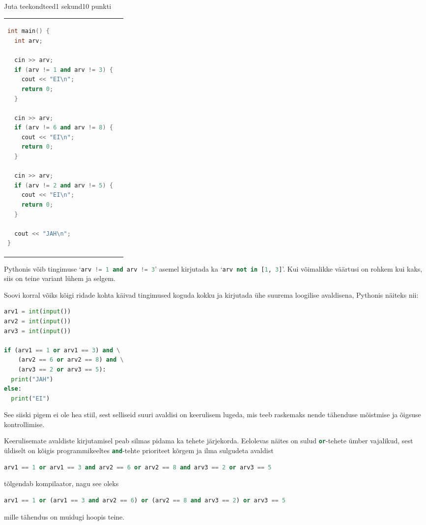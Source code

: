 \begin{yl}{1}{Juta teekond}{teed}{1 sekund}{10 punkti}
\begin{tabular}{p{\colwidth} p{\colwidth}}
\begin{lstlisting}[language=C++]
int main() {
  int arv;

  cin >> arv;
  if (arv != 1 and arv != 3) {
    cout << "EI\n";
    return 0;
  }

  cin >> arv;
  if (arv != 6 and arv != 8) {
    cout << "EI\n";
    return 0;
  }

  cin >> arv;
  if (arv != 2 and arv != 5) {
    cout << "EI\n";
    return 0;
  }

  cout << "JAH\n";
}
\end{lstlisting}
\end{tabular}

Pythonis võib tingimuse `\lstinline[language=Python]|arv != 1 and arv != 3|' asemel kirjutada ka `\lstinline[language=Python]|arv not in [1, 3]|'. Kui võimalikke väärtusi on rohkem kui kaks, siis on teine variant lühem ja selgem.

Soovi korral võiks kõigi ridade kohta käivad tingimused koguda kokku ja kirjutada ühe suurema loogilise avaldisena, Pythonis näiteks nii:

\begin{lstlisting}[language=Python]
arv1 = int(input())
arv2 = int(input())
arv3 = int(input())

if (arv1 == 1 or arv1 == 3) and \
    (arv2 == 6 or arv2 == 8) and \
    (arv3 == 2 or arv3 == 5):
  print("JAH")
else:
  print("EI")
\end{lstlisting}

See siiski pigem ei ole hea stiil, sest selliseid suuri avaldisi on keerulisem lugeda, mis teeb raskemaks nende tähenduse mõistmise ja õigsuse kontrollimise.

Keerulisemate avaldiste kirjutamisel peab silmas pidama ka tehete järjekorda. Eelolevas näites on sulud \lstinline[language=Python]|or|-tehete ümber vajalikud, sest üldiselt on kõigis programmikeeltes \lstinline[language=Python]|and|-tehte prioriteet kõrgem ja ilma sulgudeta avaldist
\begin{lstlisting}[language=Python]
arv1 == 1 or arv1 == 3 and arv2 == 6 or arv2 == 8 and arv3 == 2 or arv3 == 5
\end{lstlisting}
tõlgendab kompilaator, nagu see oleks
\begin{lstlisting}[language=Python]
arv1 == 1 or (arv1 == 3 and arv2 == 6) or (arv2 == 8 and arv3 == 2) or arv3 == 5
\end{lstlisting}
mille tähendus on muidugi hoopis teine.

\end{yl}
